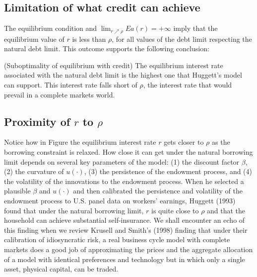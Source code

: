 \subsection{Limitation of what credit can achieve}

  The equilibrium condition  and
$\lim_{r \nearrow \rho} E a(r) = + \infty$
imply that the equilibrium value of $r$ is less than $\rho$, for
all values of the debt limit respecting the natural debt limit.
This outcome supports the following conclusion:

\medskip{} (Suboptimality of equilibrium with credit)
   The equilibrium interest rate associated with the natural debt limit
is the highest one that Huggett's model can support.  This
interest rate falls short of $\rho$, the interest rate that
would prevail in a complete markets world.

\subsection{Proximity of $r$ to  $\rho$}

  Notice how in Figure  the equilibrium interest rate $r$ gets closer
to $\rho$ as the borrowing constraint is relaxed.  How close it can get
under the natural borrowing limit depends on several key parameters
of the model: (1) the discount factor $\beta$,
(2) the curvature of $u(\cdot)$, (3) the persistence of the endowment
process, and (4) the volatility of the innovations to the endowment
process.  When he selected a plausible $\beta$ and $u(\cdot)$ and then
calibrated the persistence and volatility of the
endowment process to U.S. panel data on workers' earnings,
  Huggett (1993) found that under the natural borrowing limit,
$r$  is quite close to $\rho$ and that the household can achieve
substantial self-insurance.
We shall encounter an echo of this finding when we review
Krusell and Smith's (1998) finding that under their calibration
of idiosyncratic risk, a real business cycle model with complete markets does
a good job of approximating the prices and the aggregate allocation
of a  model with identical preferences and technology but  in which only a single asset, physical capital, can be traded.

